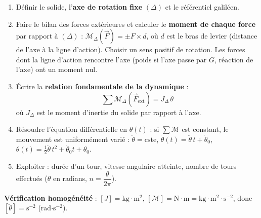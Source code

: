 \documentclass[11pt]{article}
\begin{document}
\begin{methode}
\begin{enumerate}
\item Définir le solide, l'\textbf{axe de rotation fixe} $(\Delta)$ et le référentiel galiléen.
\item Faire le bilan des forces extérieures et calculer le \textbf{moment de chaque force} par rapport à $(\Delta)$ : $\mathcal{M}_{\Delta}(\vec{F}) = \pm F \times d$, où $d$ est le bras de levier (distance de l'axe à la ligne d'action). Choisir un sens positif de rotation. Les forces dont la ligne d'action rencontre l'axe (poids si l'axe passe par $G$, réaction de l'axe) ont un moment nul.
\item Écrire la \textbf{relation fondamentale de la dynamique} :
\[ \sum \mathcal{M}_{\Delta}(\vec{F}_{\text{ext}}) = J_{\Delta}\,\ddot{\theta} \]
où $J_{\Delta}$ est le moment d'inertie du solide par rapport à l'axe.
\item Résoudre l'équation différentielle en $\theta(t)$ : si $\sum \mathcal{M}$ est constant, le mouvement est uniformément varié : $\ddot{\theta} = \text{cste}$, $\dot{\theta}(t) = \ddot{\theta}\,t + \dot{\theta}_0$, $\theta(t) = \tfrac{1}{2}\ddot{\theta}\,t^2 + \dot{\theta}_0 t + \theta_0$.
\item Exploiter : durée d'un tour, vitesse angulaire atteinte, nombre de tours effectués ($\theta$ en radians, $n = \dfrac{\theta}{2\pi}$).
\end{enumerate}
\textbf{Vérification homogénéité} : $[J] = \text{kg}\!\cdot\!\text{m}^2$, $[\mathcal{M}] = \text{N}\!\cdot\!\text{m} = \text{kg}\!\cdot\!\text{m}^2\!\cdot\!\text{s}^{-2}$, donc $[\ddot{\theta}] = \text{s}^{-2}$ (rad$\cdot$s$^{-2}$).
\end{methode}
\end{document}
